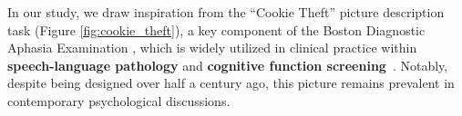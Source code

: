 In our study, we draw inspiration from the ``Cookie Theft'' picture description task (Figure \ref{fig:cookie_theft}), a key component of the Boston Diagnostic Aphasia Examination \cite{goodglass2001-ej}, which is widely utilized in clinical practice within \textbf{speech-language pathology} \cite{describe-ctp} and \textbf{cognitive function screening}~\cite{mueller2018connected}. Notably, despite being designed over half a century ago, this picture remains prevalent in contemporary psychological discussions.



